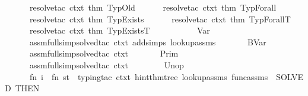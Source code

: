 \begin{isabellebody}
\ \ \ \ \ \ resolve{\isacharunderscore}{\kern0pt}tac\ ctxt\ {\isacharbrackleft}{\kern0pt}{\isacharat}{\kern0pt}{\isacharbraceleft}{\kern0pt}thm\ TypOld{\isacharbraceright}{\kern0pt}{\isacharbrackright}{\kern0pt}{\isacharcomma}{\kern0pt}\isanewline
\ \ \ \ \ \ resolve{\isacharunderscore}{\kern0pt}tac\ ctxt\ {\isacharbrackleft}{\kern0pt}{\isacharat}{\kern0pt}{\isacharbraceleft}{\kern0pt}thm\ TypForall{\isacharbraceright}{\kern0pt}{\isacharbrackright}{\kern0pt}{\isacharcomma}{\kern0pt}\isanewline
\ \ \ \ \ \ resolve{\isacharunderscore}{\kern0pt}tac\ ctxt\ {\isacharbrackleft}{\kern0pt}{\isacharat}{\kern0pt}{\isacharbraceleft}{\kern0pt}thm\ TypExists{\isacharbraceright}{\kern0pt}{\isacharbrackright}{\kern0pt}{\isacharcomma}{\kern0pt}\isanewline
\ \ \ \ \ \ resolve{\isacharunderscore}{\kern0pt}tac\ ctxt\ {\isacharbrackleft}{\kern0pt}{\isacharat}{\kern0pt}{\isacharbraceleft}{\kern0pt}thm\ TypForallT{\isacharbraceright}{\kern0pt}{\isacharbrackright}{\kern0pt}{\isacharcomma}{\kern0pt}\isanewline
\ \ \ \ \ \ resolve{\isacharunderscore}{\kern0pt}tac\ ctxt\ {\isacharbrackleft}{\kern0pt}{\isacharat}{\kern0pt}{\isacharbraceleft}{\kern0pt}thm\ TypExistsT{\isacharbraceright}{\kern0pt}{\isacharbrackright}{\kern0pt}\isanewline
\ \ \ \ {\isacharbrackright}{\kern0pt}\isanewline
\ \ \ \ {\isacharbrackleft}{\kern0pt}\ {\isacharparenleft}{\kern0pt}{\isacharasterisk}{\kern0pt}\ Var\ {\isacharasterisk}{\kern0pt}{\isacharparenright}{\kern0pt}\isanewline
\ \ \ \ \ \ assm{\isacharunderscore}{\kern0pt}full{\isacharunderscore}{\kern0pt}simp{\isacharunderscore}{\kern0pt}solved{\isacharunderscore}{\kern0pt}tac\ {\isacharparenleft}{\kern0pt}ctxt\ addsimps\ lookup{\isacharunderscore}{\kern0pt}assms{\isacharparenright}{\kern0pt}{\isacharcomma}{\kern0pt}\isanewline
\ \ \ \ \ \ {\isacharparenleft}{\kern0pt}{\isacharasterisk}{\kern0pt}\ BVar\ {\isacharasterisk}{\kern0pt}{\isacharparenright}{\kern0pt}\isanewline
\ \ \ \ \ \ assm{\isacharunderscore}{\kern0pt}full{\isacharunderscore}{\kern0pt}simp{\isacharunderscore}{\kern0pt}solved{\isacharunderscore}{\kern0pt}tac\ ctxt{\isacharcomma}{\kern0pt}\isanewline
\ \ \ \ \ \ {\isacharparenleft}{\kern0pt}{\isacharasterisk}{\kern0pt}\ Prim\ {\isacharasterisk}{\kern0pt}{\isacharparenright}{\kern0pt}\isanewline
\ \ \ \ \ \ assm{\isacharunderscore}{\kern0pt}full{\isacharunderscore}{\kern0pt}simp{\isacharunderscore}{\kern0pt}solved{\isacharunderscore}{\kern0pt}tac\ ctxt{\isacharcomma}{\kern0pt}\ \isanewline
\ \ \ \ \ \ {\isacharparenleft}{\kern0pt}{\isacharasterisk}{\kern0pt}\ Unop\ {\isacharasterisk}{\kern0pt}{\isacharparenright}{\kern0pt}\isanewline
\ \ \ \ \ \ fn\ i\ {\isacharequal}{\kern0pt}{\isachargreater}{\kern0pt}\ fn\ st\ {\isacharequal}{\kern0pt}{\isachargreater}{\kern0pt}\ {\isacharparenleft}{\kern0pt}{\isacharparenleft}{\kern0pt}{\isacharparenleft}{\kern0pt}typing{\isacharunderscore}{\kern0pt}tac\ ctxt\ hint{\isacharunderscore}{\kern0pt}thm{\isacharunderscore}{\kern0pt}tree\ lookup{\isacharunderscore}{\kern0pt}assms\ func{\isacharunderscore}{\kern0pt}assms{\isacharparenright}{\kern0pt}\ {\isacharbar}{\kern0pt}{\isachargreater}{\kern0pt}\ SOLVED{\isacharprime}{\kern0pt}{\isacharparenright}{\kern0pt}\ THEN{\isacharprime}{\kern0pt}\ \isanewline

\end{isabellebody}
